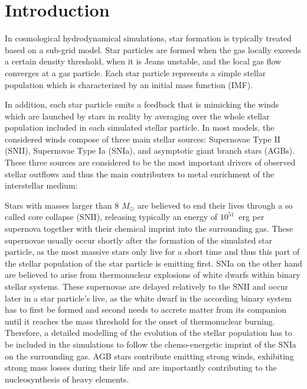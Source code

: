 \documentclass[galaxies,letter,accept,moreauthors,pdftex,10pt,a4paper,usenatbib]{mdpi}
\begin{document}
\section{Introduction}

In cosmological hydrodynamical simulations, star formation is
typically treated based on a sub-grid model. Star particles are formed
when the gas locally exceeds a certain density threshold, when it is
Jeans unstable, and the local gas flow converges at a gas
particle. Each star particle represents a simple stellar population
which is characterized by an initial mass function (IMF). 

In addition, each star particle emits a feedback that is mimicking the
winds which are launched by stars in reality by averaging over the
whole stellar population included in each simulated stellar particle.
In most models, the considered winds compose of three main stellar
sources: Supernovae Type II (SNII), Supernovae Type Ia (SNIa), and
asymptotic giant branch stars (AGBs).   These three sources are
considered to be the most important drivers of observed stellar
outflows and thus the main contributers to metal enrichment of the
interstellar medium:

Stars with masses larger than 8 $M_\odot$ are believed to end their
lives through a so called core collapse (SNII), releasing typically an
energy of $10^{51}$~erg per supernova together with their chemical
imprint into the surrounding gas. These supernovae usually occur
shortly after the formation of the simulated star particle, as the
most massive stars only live for a short time and thus this part of
the stellar population of the star particle is emitting first.  SNIa
on the other hand are believed to arise from thermonuclear explosions
of white dwarfs within binary stellar systems. These supernovae are
delayed relatively to the SNII and occur later in a star particle's
live, as the white dwarf in the according binary system has to first
be formed and second needs to  accrete matter from its companion until
it reaches the mass threshold for the onset of thermonuclear
burning. Therefore, a detailed modelling of the evolution of the
stellar population has to be included in the simulations to follow the
chemo-energetic imprint of the SNIa on the surrounding gas.  AGB stars
contribute emitting strong winds, exhibiting strong mass losses during
their life and are importantly contributing to the nucleosynthesis of
heavy elements. 
\end{document}
